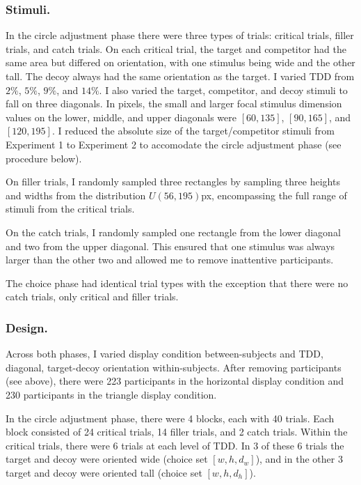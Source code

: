 \subsubsection{Stimuli.}
In the circle adjustment phase there were three types of trials: critical trials, filler trials, and catch trials. On each critical trial, the target and competitor had the same area but differed on orientation, with one stimulus being wide and the other tall. The decoy always had the same orientation as the target. I varied TDD from $2\%$, $5\%$, $9\%$, and $14\%$. I also varied the target, competitor, and decoy stimuli to fall on three diagonals. In pixels, the small and larger focal stimulus dimension values on the lower, middle, and upper diagonals were $[60, 135]$, $[90, 165]$, and $[120,195]$. I reduced the absolute size of the target/competitor stimuli from Experiment 1 to Experiment 2 to accomodate the circle adjustment phase (see procedure below).

On filler trials, I randomly sampled three rectangles by sampling three heights and widths from the distribution $U(56,195)$px, encompassing the full range of stimuli from the critical trials.

On the catch trials, I randomly sampled one rectangle from the lower diagonal and two from the upper diagonal. This ensured that one stimulus was always larger than the other two and allowed me to remove inattentive participants.

The choice phase had identical trial types with the exception that there were no catch trials, only critical and filler trials.

\subsubsection{Design.}
Across both phases, I varied display condition between-subjects and TDD, diagonal, target-decoy orientation within-subjects. After removing participants (see above), there were 223 participants in the horizontal display condition and 230 participants in the triangle display condition. 

In the circle adjustment phase, there were 4 blocks, each with 40 trials. Each block consisted of 24 critical trials, 14 filler trials, and 2 catch trials. Within the critical trials, there were 6 trials at each level of TDD. In 3 of these 6 trials the target and decoy were oriented wide (choice set $[w,h,d_{w}]$), and in the other 3 target and decoy were oriented tall (choice set $[w,h,d_{h}]$). 

